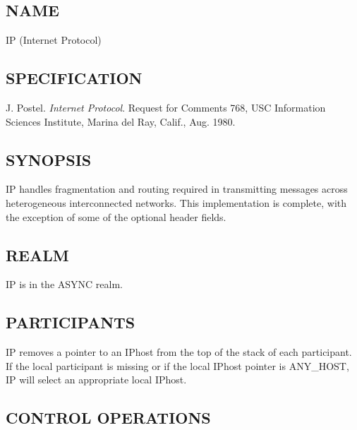 %
%
%

\subsection*{NAME}

\noindent IP (Internet Protocol)

\subsection*{SPECIFICATION}

\noindent J. Postel. {\it Internet Protocol}. Request for Comments 
768, USC Information Sciences Institute, Marina del Ray, Calif., Aug. 1980.

\subsection*{SYNOPSIS}

\noindent IP handles fragmentation and routing required in
transmitting messages across heterogeneous interconnected networks.
This implementation is complete, with the exception of some of the
optional header fields.

\subsection*{REALM}

IP is in the ASYNC realm.

\subsection*{PARTICIPANTS}

IP removes a pointer to an IPhost
from the top of the stack of each participant.  If the local
participant is missing or if the local IPhost pointer is ANY\_HOST, 
IP will select an appropriate local IPhost.  

\subsection*{CONTROL OPERATIONS}

